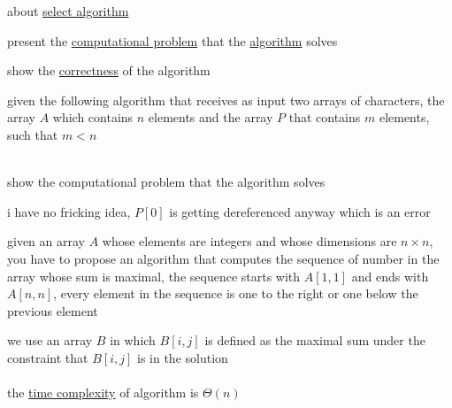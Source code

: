 \documentclass[a4paper,12pt]{article}
\newcommand{\?}{\stackrel{?}{=}}
\begin{document}
\newenvironment{note}
  {\begin{bclogo}[logo=\bcinfo, couleurBarre=orange, couleur=lightgray]{ note}}
  {\end{bclogo}}
\newenvironment{attention}
  {\begin{bclogo}[logo=\bcattention, couleurBarre=red, noborder=true, 
                couleur=red!15]{Important!}}
  {\end{bclogo}}

\begin{question}
about \href{20230120221836-select_algorithm.org}{select algorithm}\\[0pt]
\begin{subquestion}
present the \href{20221223133700-computational_problem.org}{computational problem} that the \href{20220706211958-algorithm.org}{algorithm} solves\\[0pt]
\end{subquestion}
\begin{subquestion}
show the \href{20221104220603-algorithm_correctness.org}{correctness} of the algorithm\\[0pt]
\end{subquestion}
\end{question}
\begin{question}
given the following algorithm that receives as input two arrays of characters, the array \(A\) which contains \(n\) elements and the array \(P\) that contains \(m\) elements, such that \(m<n\)\\[0pt]
\\[0pt]

\begin{subquestion}
show the computational problem that the algorithm solves\\[0pt]
\begin{answer}
i have no fricking idea, \(P[0]\) is getting dereferenced anyway which is an error\\[0pt]
\end{answer}
\end{subquestion}
\label{orgffda0d4}
\end{question}
\begin{question}
given an array \(A\) whose elements are integers and whose dimensions are \(n \times n\), you have to propose an algorithm that computes the sequence of number in the array whose sum is maximal, the sequence starts with \(A[1,1]\) and ends with \(A[n,n]\), every element in the sequence is one to the right or one below the previous element\\[0pt]
\begin{answer}
we use an array \(B\) in which \(B[i,j]\) is defined as the maximal sum under the constraint that \(B[i,j]\) is in the solution\\[0pt]
\\[0pt]

the \href{20221130014441-time_complexity.org}{time complexity} of algorithm is \(\Theta(n)\)\\[0pt]
\end{answer}
\label{org8e7ba57}
\end{question}
\end{document}
